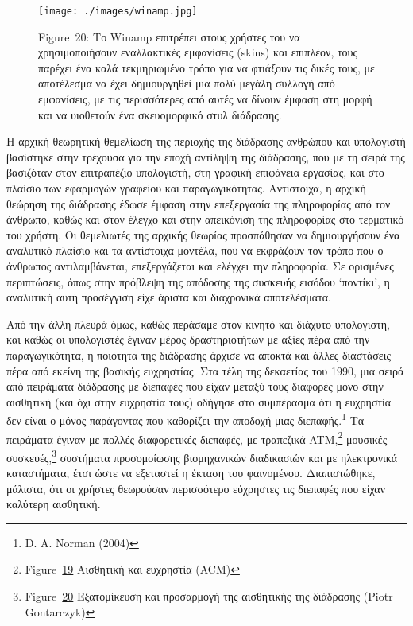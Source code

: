 \documentclass[
]{article}
\begin{document}
\leavevmode{}%
\begin{figure}
\hypertarget{fig:winamp}{%
\centering
\texttt{[image: ./images/winamp.jpg]}
\caption{Figure~20: Το Winamp επιτρέπει στους χρήστες του να
χρησιμοποιήσουν εναλλακτικές εμφανίσεις (skins) και επιπλέον, τους
παρέχει ένα καλά τεκμηριωμένο τρόπο για να φτιάξουν τις δικές τους, με
αποτέλεσμα να έχει δημιουργηθεί μια πολύ μεγάλη συλλογή από εμφανίσεις,
με τις περισσότερες από αυτές να δίνουν έμφαση στη μορφή και να
υιοθετούν ένα σκευομορφικό στυλ διάδρασης.}\label{fig:winamp}
}
\end{figure}

Η αρχική θεωρητική θεμελίωση της περιοχής της διάδρασης ανθρώπου και
υπολογιστή βασίστηκε στην τρέχουσα για την εποχή αντίληψη της διάδρασης,
που με τη σειρά της βασιζόταν στον επιτραπέζιο υπολογιστή, στη γραφική
επιφάνεια εργασίας, και στο πλαίσιο των εφαρμογών γραφείου και
παραγωγικότητας. Αντίστοιχα, η αρχική θεώρηση της διάδρασης έδωσε έμφαση
στην επεξεργασία της πληροφορίας από τον άνθρωπο, καθώς και στον έλεγχο
και στην απεικόνιση της πληροφορίας στο τερματικό του χρήστη. Οι
θεμελιωτές της αρχικής θεωρίας προσπάθησαν να δημιουργήσουν ένα
αναλυτικό πλαίσιο και τα αντίστοιχα μοντέλα, που να εκφράζουν τον τρόπο
που ο άνθρωπος αντιλαμβάνεται, επεξεργάζεται και ελέγχει την πληροφορία.
Σε ορισμένες περιπτώσεις, όπως στην πρόβλεψη της απόδοσης της συσκευής
εισόδου `ποντίκι', η αναλυτική αυτή προσέγγιση είχε άριστα και
διαχρονικά αποτελέσματα.

Από την άλλη πλευρά όμως, καθώς περάσαμε στον κινητό και διάχυτο
υπολογιστή, και καθώς οι υπολογιστές έγιναν μέρος δραστηριοτήτων με
αξίες πέρα από την παραγωγικότητα, η ποιότητα της διάδρασης άρχισε να
αποκτά και άλλες διαστάσεις πέρα από εκείνη της βασικής ευχρηστίας. Στα
τέλη της δεκαετίας του 1990, μια σειρά από πειράματα διάδρασης με
διεπαφές που είχαν μεταξύ τους διαφορές μόνο στην αισθητική (και όχι
στην ευχρηστία τους) οδήγησε στο συμπέρασμα ότι η ευχρηστία δεν είναι ο
μόνος παράγοντας που καθορίζει την αποδοχή μιας διεπαφής.\footnote{D. A.
  Norman (2004)} Τα πειράματα έγιναν με πολλές διαφορετικές διεπαφές, με
τραπεζικά ATM,\footnote{Figure~\protect\hyperlink{fig:atm-affective}{19}
  Αισθητική και ευχρηστία (ACM)} μουσικές συσκευές,\footnote{Figure~\protect\hyperlink{fig:winamp}{20}
  Εξατομίκευση και προσαρμογή της αισθητικής της διάδρασης (Piotr
  Gontarczyk)} συστήματα προσομοίωσης βιομηχανικών διαδικασιών και με
ηλεκτρονικά καταστήματα, έτσι ώστε να εξεταστεί η έκταση του φαινομένου.
Διαπιστώθηκε, μάλιστα, ότι οι χρήστες θεωρούσαν περισσότερο εύχρηστες
τις διεπαφές που είχαν καλύτερη αισθητική.
\end{document}
